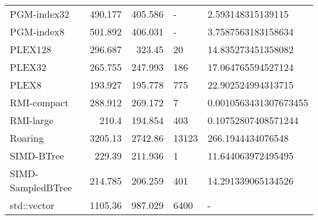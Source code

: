 \begin{tabular}{lrrll}
 PGM-index32       &                490.177 &               405.586 & -            & 2.593148315139115     \\
 PGM-index8        &                501.892 &               406.031 & -            & 3.7587563183158634    \\
 PLEX128           &                296.687 &               323.45  & 20           & 14.835273451358082    \\
 PLEX32            &                265.755 &               247.993 & 186          & 17.064765594527124    \\
 PLEX8             &                193.927 &               195.778 & 775          & 22.902524994313715    \\
 RMI-compact       &                288.912 &               269.172 & 7            & 0.0010563431307673455 \\
 RMI-large         &                210.4   &               194.854 & 403          & 0.10752807408571244   \\
 Roaring           &               3205.13  &              2742.86  & 13123        & 266.1944434076548     \\
 SIMD-BTree        &                229.39  &               211.936 & 1            & 11.644063972495495    \\
 SIMD-SampledBTree &                214.785 &               206.259 & 401          & 14.291339065134526    \\
 std::vector       &               1105.36  &               987.029 & 6400         & -                     \\
\hline
\end{tabular}